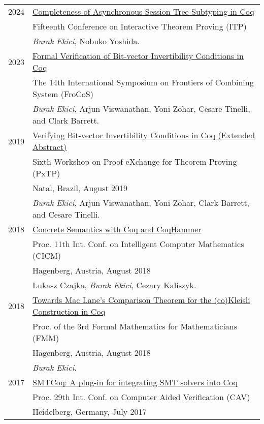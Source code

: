 \documentclass[a4paper,9pt]{article} %
\begin{document}
\begin{longtable}{ll}	
2024 & 
{\href{https://github.com/ekiciburak/sessionTreeST/tree/localtype}{Completeness of Asynchronous Session Tree Subtyping in Coq}} \\
& Fifteenth Conference on Interactive Theorem Proving (ITP) \\
& \emph{Burak Ekici}, Nobuko Yoshida.
 \\[0.20cm]
2023 & 
{\href{https://link.springer.com/chapter/10.1007/978-3-031-43369-6_3}{Formal Verification of Bit-vector Invertibility Conditions in Coq}} \\
& The 14th International Symposium on Frontiers of Combining System (FroCoS) \\
& \emph{Burak Ekici}, Arjun Viswanathan, Yoni Zohar, Cesare
Tinelli, and Clark Barrett.
 \\[0.20cm]
2019 & 
{\href{http://pxtp.gforge.inria.fr/2019/papers/PxTP_2019_paper_5.pdf}{Verifying Bit-vector Invertibility Conditions in Coq (Extended Abstract)}}\\
& Sixth Workshop on Proof eXchange for Theorem Proving (PxTP)\\
& Natal, Brazil, August 2019 \\
& \emph{Burak Ekici}, Arjun Viswanathan, Yoni Zohar, Clark Barrett, and Cesare
Tinelli.
 \\[0.20cm]
2018 & 
{\href{https://www.mimuw.edu.pl/~lukaszcz/cicm2018.pdf}{Concrete Semantics with Coq and CoqHammer}}\\ 
& Proc. 11th Int. Conf. on Intelligent Computer Mathematics (CICM)\\
& Hagenberg, Austria, August 2018\\
& Lukasz Czajka, \emph{Burak Ekici}, Cezary Kaliszyk.
 \\[0.20cm]
2018 & 
{\href{https://www.cicm-conference.org/2018/infproc/paper11.pdf}{Towards Mac Lane's Comparison Theorem for the (co)Kleisli Construction in Coq}}\\
& Proc. of the 3rd Formal Mathematics for Mathematicians (FMM) \\
& Hagenberg, Austria, August 2018 \\
& \emph{Burak Ekici}.
 \\[0.20cm]
2017 & 
{\href{http://homepage.divms.uiowa.edu/~tinelli/papers/EkiEtAl-CAV-17.pdf}{SMTCoq: A plug-in for integrating SMT solvers into Coq}}\\
& Proc. 29th Int. Conf. on Computer Aided Verification (CAV) \\
& Heidelberg, Germany, July 2017 \\

\end{longtable}
\end{document}
